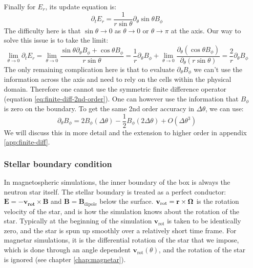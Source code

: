 Finally for $E_{r}$, its update equation is:
\begin{equation}
  \label{eq:Er-update}
  \partial_tE_r = \frac{1}{r\sin\theta}\partial_{\theta}\sin\theta B_{\phi}
\end{equation}
The difficulty here is that $\sin\theta \to 0$ as $\theta\to 0$ or
$\theta\to\pi$ at the axis. Our way to solve this issue is to take the limit:
\begin{equation}
  \label{eq:biot-savart}
  \lim_{\theta\to 0}\partial_tE_r = \lim_{\theta \to 0}\frac{\sin\theta\partial_{\theta} B_{\phi} + \cos\theta B_{\phi}}{r\sin\theta} = \frac{1}{r}\partial_{\theta}B_{\phi} + \lim_{\theta\to 0}\frac{\partial_{\theta}(\cos\theta B_{\phi})}{\partial_{\theta}(r\sin\theta)} = \frac{2}{r}\partial_{\theta}B_{\phi}
\end{equation}
The only remaining complication here is that to evaluate
$\partial_{\theta}B_{\phi}$ we can't use the information across the axis and
need to rely on the cells within the physical domain. Therefore one cannot use
the symmetric finite difference operator (equation
\eqref{eq:finite-diff-2nd-order}). One can however use the information that
$B_{\phi}$ is zero on the boundary. To get the same 2nd order accuracy in
$\Delta \theta$, we can use:
\begin{equation}
  \label{eq:one-sided-2nd-order}
  \partial_\theta B_{\phi} = 2B_{\phi}(\Delta\theta) - \frac{1}{2}B_{\phi}(2\Delta \theta) + O(\Delta \theta^{3})
\end{equation}
We will discuss this in more detail and the extension to higher order in
appendix \ref{app:finite-diff}.

\subsubsection{Stellar boundary condition}
\label{sec:stellar-bc}

In magnetospheric simulations, the inner boundary of the box is always the
neutron star itself. The stellar boundary is treated as a perfect conductor:
$\mathbf{E} = -\mathbf{v}_\mathbf{rot}\times \mathbf{B}$ and $\mathbf{B} =
\mathbf{B}_\mathrm{dipole}$ below the surface. $\mathbf{v}_\mathrm{rot} =
\mathbf{r}\times \bm{\Omega}$ is the rotation velocity of the star, and is how the
simulation knows about the rotation of the star. Typically at the beginning of
the simulation $\mathbf{v}_\mathrm{rot}$ is taken to be identically zero, and
the star is spun up smoothly over a relatively short time frame. For magnetar
simulations, it is the differential rotation of the star that we impose, which
is done through an angle dependent $\mathbf{v}_\mathrm{rot}(\theta)$, and the
rotation of the star is ignored (see chapter \ref{chap:magnetar}).

